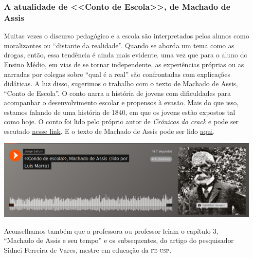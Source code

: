 \documentclass[12pt]{extarticle}
\begin{document}
\subsubsection{A atualidade de <<Conto de Escola>>, de Machado de Assis}

Muitas vezes o discurso pedagógico e a escola são interpretados
pelos alunos como moralizantes ou ``distante da realidade''. Quando
se aborda um tema como as drogas, então, essa tendência é ainda mais evidente, 
uma vez que para o aluno do Ensino Médio, em vias de se tornar independente, 
as experiências próprias ou as narradas por colegas sobre ``qual é 
a real'' são confrontadas com explicações didáticas. A luz disso, sugerimos 
o trabalho com o texto de Machado de Assis, ``Conto de Escola''. O conto narra
a história de jovens com dificuldades para acompanhar o desenvolvimento escolar
e propensos à evasão. Mais do que isso, estamos falando de uma história de 
1840, em que os jovens estão expostos tal como hoje. O conto foi lido 
pelo próprio autor de \textit{Crônicas do crack} e pode ser escutado \href{https://soundcloud.com/jorge-sallum/condo-de-escola-machado-de-assis-lido-por-luis-marra}{nesse link}. E o texto de Machado de Assis pode ser lido \href{http://www.dominiopublico.gov.br/download/texto/ua000191.pdf}{aqui}. 

\bigskip

\noindent\href{https://soundcloud.com/jorge-sallum/condo-de-escola-machado-de-assis-lido-por-luis-marra}{\includegraphics[width=\textwidth]{./images/PNLD0027-16}}

\bigskip


Aconselhamos também que a professora ou professor leiam o capítulo 3,
``Machado de Assis e seu tempo'' e os subsequentes, do artigo do 
pesquisador Sidnei Ferreira de Vares, mestre em educação da \textsc{fe-usp}. 
\end{document}
